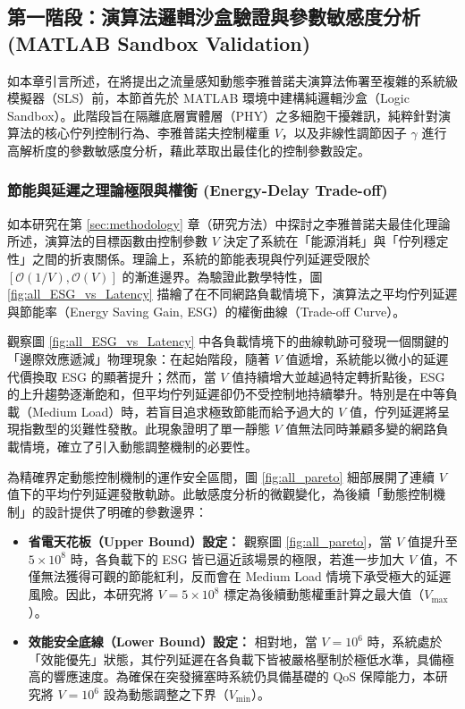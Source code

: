 \subsection{第一階段：演算法邏輯沙盒驗證與參數敏感度分析 (MATLAB Sandbox Validation)}
\label{sec:matlab_sandbox}
如本章引言所述，在將提出之流量感知動態李雅普諾夫演算法佈署至複雜的系統級模擬器（SLS）前，本節首先於 MATLAB 環境中建構純邏輯沙盒（Logic Sandbox）。此階段旨在隔離底層實體層（PHY）之多細胞干擾雜訊，純粹針對演算法的核心佇列控制行為、李雅普諾夫控制權重 $V$，以及非線性調節因子 $\gamma$ 進行高解析度的參數敏感度分析，藉此萃取出最佳化的控制參數設定。
\subsubsection{節能與延遲之理論極限與權衡 (Energy-Delay Trade-off)}
如本研究在第 \ref{sec:methodology} 章（研究方法）中探討之李雅普諾夫最佳化理論所述，演算法的目標函數由控制參數 $V$ 決定了系統在「能源消耗」與「佇列穩定性」之間的折衷關係。理論上，系統的節能表現與佇列延遲受限於 $[\mathcal{O}(1/V), \mathcal{O}(V)]$ 的漸進邊界。為驗證此數學特性，圖 \ref{fig:all_ESG_vs_Latency} 描繪了在不同網路負載情境下，演算法之平均佇列延遲與節能率（Energy Saving Gain, ESG）的權衡曲線（Trade-off Curve）。

觀察圖 \ref{fig:all_ESG_vs_Latency} 中各負載情境下的曲線軌跡可發現一個關鍵的「邊際效應遞減」物理現象：在起始階段，隨著 $V$ 值遞增，系統能以微小的延遲代價換取 ESG 的顯著提升；然而，當 $V$ 值持續增大並越過特定轉折點後，ESG 的上升趨勢逐漸飽和，但平均佇列延遲卻仍不受控制地持續攀升。特別是在中等負載（Medium Load）時，若盲目追求極致節能而給予過大的 $V$ 值，佇列延遲將呈現指數型的災難性發散。此現象證明了單一靜態 $V$ 值無法同時兼顧多變的網路負載情境，確立了引入動態調整機制的必要性。

為精確界定動態控制機制的運作安全區間，圖 \ref{fig:all_pareto} 細部展開了連續 $V$ 值下的平均佇列延遲發散軌跡。此敏感度分析的微觀變化，為後續「動態控制機制」的設計提供了明確的參數邊界：
\begin{itemize}
    \item \textbf{省電天花板（Upper Bound）設定：} 觀察圖 \ref{fig:all_pareto}，當 $V$ 值提升至 $5 \times 10^8$ 時，各負載下的 ESG 皆已逼近該場景的極限，若進一步加大 $V$ 值，不僅無法獲得可觀的節能紅利，反而會在 Medium Load 情境下承受極大的延遲風險。因此，本研究將 $V = 5 \times 10^8$ 標定為後續動態權重計算之最大值（$V_{\max}$）。
    \item \textbf{效能安全底線（Lower Bound）設定：} 相對地，當 $V = 10^6$ 時，系統處於「效能優先」狀態，其佇列延遲在各負載下皆被嚴格壓制於極低水準，具備極高的響應速度。為確保在突發擁塞時系統仍具備基礎的 QoS 保障能力，本研究將 $V = 10^6$ 設為動態調整之下界（$V_{\min}$）。
\end{itemize}

